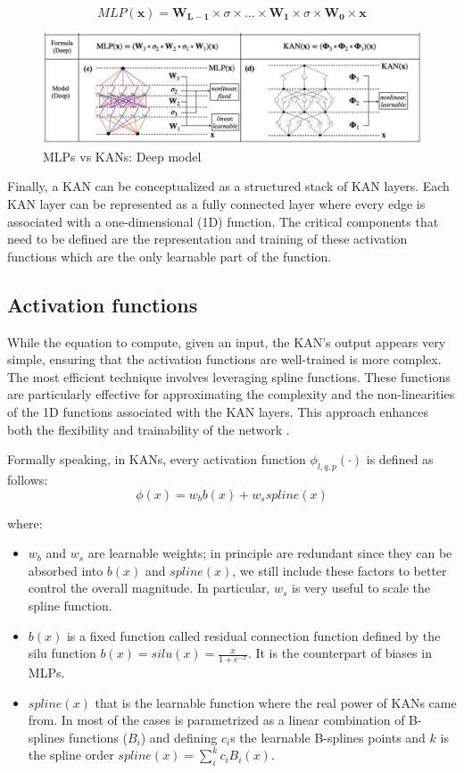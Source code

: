 \documentclass[12pt,a4paper]{article}
\begin{document}
$$MLP(\textbf{x}) = \boldsymbol{W_{L-1}} \times \sigma \times \dots \times \boldsymbol{W_{1}} \times \sigma \times\boldsymbol{W_{0}} \times \textbf{x}$$

\begin{figure}[H]
    \centering
    \includegraphics[width=0.8\linewidth]{Images/B.JPG}
    \caption{ MLPs vs KANs: Deep model }
\end{figure}

Finally, a KAN can be conceptualized as a structured stack of KAN layers. Each KAN layer can be represented as a fully connected layer where every edge is associated with a one-dimensional (1D) function. The critical components that need to be defined are the representation and training of these activation functions which are the only learnable part of the function.

\subsection{Activation functions}
While the equation to compute, given an input, the KAN's output appears very simple, ensuring that the activation functions are well-trained is more complex. The most efficient technique involves leveraging spline functions. These functions are particularly effective for approximating the complexity and the non-linearities of the 1D functions associated with the KAN layers. This approach enhances both the flexibility and trainability of the network \cite{KAN}.

Formally speaking, in KANs, every activation function $\phi_{l,q,p}(\cdot)$ is defined as follows:
$$\phi(x) = w_bb(x) + w_sspline(x) $$

where:
\begin{itemize}
    \item $w_b$ and $w_s$ are learnable weights; in principle are redundant since they can be absorbed into $b(x)$ and $spline(x)$, we still include these factors to better control the overall magnitude. In particular, $w_s$ is very useful to scale the spline function.
    \item $b(x)$ is a fixed function called residual connection function defined by the silu function $b(x) = silu(x) = \frac{x}{1+e^{-x}}$. It is the counterpart of biases in MLPs.
    \item $spline(x)$ that is the learnable function where the real power of KANs came from. In most of the cases is parametrized as a linear combination of B-splines functions ($B_i$) and defining $c_i$s the learnable B-splines points and $k$ is the spline order $spline(x)= \sum_i^k c_iB_i(x)$.
\end{itemize}
\end{document}
